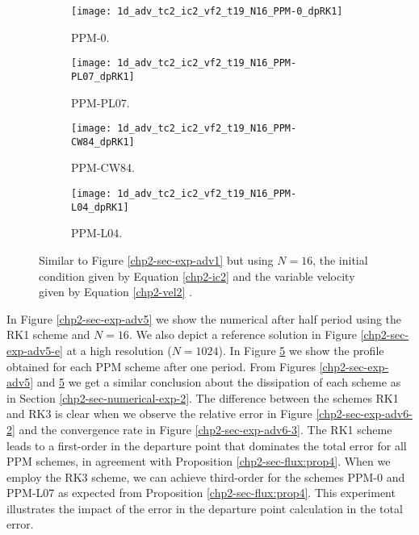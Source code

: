 \begin{figure}[!htb]
  \centering
  \begin{subfigure}{0.49\textwidth}
    \centering
			\texttt{[image: 1d\_adv\_tc2\_ic2\_vf2\_t19\_N16\_PPM-0\_dpRK1]}
			\caption{PPM-0.\label{chp2-sec-exp-adv6-a}}
  \end{subfigure}
  \begin{subfigure}{0.49\textwidth}
    \centering
			\texttt{[image: 1d\_adv\_tc2\_ic2\_vf2\_t19\_N16\_PPM-PL07\_dpRK1]}
			\caption{PPM-PL07.\label{chp2-sec-exp-adv6-b}}
  \end{subfigure}

  \begin{subfigure}{0.49\textwidth}
    \centering
		\texttt{[image: 1d\_adv\_tc2\_ic2\_vf2\_t19\_N16\_PPM-CW84\_dpRK1]}
    \caption{PPM-CW84.\label{chp2-sec-exp-adv6-c}}
  \end{subfigure}
  \begin{subfigure}{0.49\textwidth}
    \centering
			\texttt{[image: 1d\_adv\_tc2\_ic2\_vf2\_t19\_N16\_PPM-L04\_dpRK1]}
      \caption{PPM-L04.\label{chp2-sec-exp-adv6-d}}
  \end{subfigure} 
	\caption{ Similar to Figure \ref{chp2-sec-exp-adv1} but using $N=16$, 
	the initial condition given by Equation \eqref{chp2-ic2} and the variable velocity given by Equation
	\eqref{chp2-vel2} \label{chp2-sec-exp-adv6}.}
\end{figure}
In Figure \ref{chp2-sec-exp-adv5} we show the numerical after half period using the RK1
scheme and $N=16$. 
We also depict a reference solution in Figure \ref{chp2-sec-exp-adv5-e} at a high resolution
($N=1024$).
In Figure \ref{chp2-sec-exp-adv6} we show the profile obtained for each PPM scheme after
one period.
From Figures \ref{chp2-sec-exp-adv5} and \ref{chp2-sec-exp-adv6} we get a similar
conclusion about the dissipation of each scheme as in Section \ref{chp2-sec-numerical-exp-2}.
The difference between the schemes RK1 and RK3 is clear when we observe the relative error
in Figure \ref{chp2-sec-exp-adv6-2} and the convergence rate in
Figure \ref{chp2-sec-exp-adv6-3}.
The RK1 scheme leads to a first-order in the departure point that dominates the total error
for all PPM schemes, in agreement with Proposition \ref{chp2-sec-flux:prop4}.
When we employ the RK3 scheme, we can achieve third-order for the schemes PPM-0
and PPM-L07 as expected from Proposition \ref{chp2-sec-flux:prop4}.
This experiment illustrates the impact of the error in the departure point calculation
in the total error.

